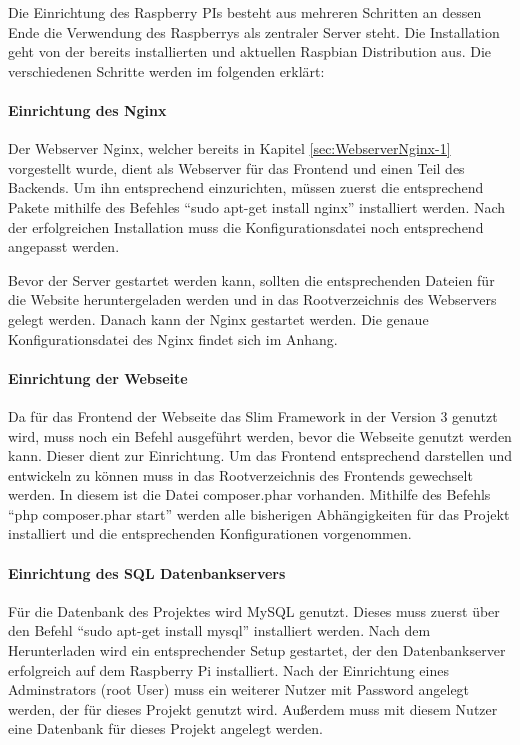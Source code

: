 Die Einrichtung des Raspberry PIs besteht aus mehreren Schritten an dessen Ende die Verwendung des Raspberrys als zentraler Server steht. Die Installation geht von der bereits installierten und aktuellen Raspbian Distribution aus. Die verschiedenen Schritte werden im folgenden erklärt: 
\paragraph{Einrichtung des Nginx} $\;$ \\ 
\label{sec:Einrichtung des Nginx-1} 
Der Webserver Nginx, welcher bereits in Kapitel \ref{sec:WebserverNginx-1} vorgestellt wurde, dient als Webserver für das Frontend und einen Teil des Backends. Um ihn entsprechend einzurichten, müssen zuerst die entsprechend Pakete mithilfe des Befehles ``sudo apt-get install nginx'' installiert werden. Nach der erfolgreichen Installation muss die Konfigurationsdatei noch entsprechend angepasst werden. 

Bevor der Server gestartet werden kann, sollten die entsprechenden Dateien für die Website heruntergeladen werden und in das Rootverzeichnis des Webservers gelegt werden. Danach kann der Nginx gestartet werden. Die genaue Konfigurationsdatei des Nginx findet sich im Anhang. 

\paragraph{Einrichtung der Webseite} $\;$ \\ 
\label{sec:EinrichtungderWebseite} 
Da für das Frontend der Webseite das Slim Framework in der Version 3 genutzt wird, muss noch ein Befehl ausgeführt werden, bevor die Webseite genutzt werden kann. Dieser dient zur Einrichtung. Um das Frontend entsprechend darstellen und entwickeln zu können muss in das Rootverzeichnis des Frontends gewechselt werden. In diesem ist die Datei composer.phar vorhanden. Mithilfe des Befehls ``php composer.phar start'' werden alle bisherigen Abhängigkeiten für das Projekt installiert und die entsprechenden Konfigurationen vorgenommen.

\paragraph{Einrichtung des SQL Datenbankservers}$\;$ \\
\label{sec:Einrichtung des SQL Datenbankservers-1} 
Für die Datenbank des Projektes wird MySQL genutzt. Dieses muss zuerst über den Befehl ``sudo apt-get install mysql'' installiert werden. Nach dem Herunterladen wird ein entsprechender Setup gestartet, der den Datenbankserver erfolgreich auf dem Raspberry Pi installiert. Nach der Einrichtung eines Adminstrators (root User) muss ein weiterer Nutzer mit Password angelegt werden, der für dieses Projekt genutzt wird. Außerdem muss mit diesem Nutzer eine Datenbank für dieses Projekt angelegt werden.

